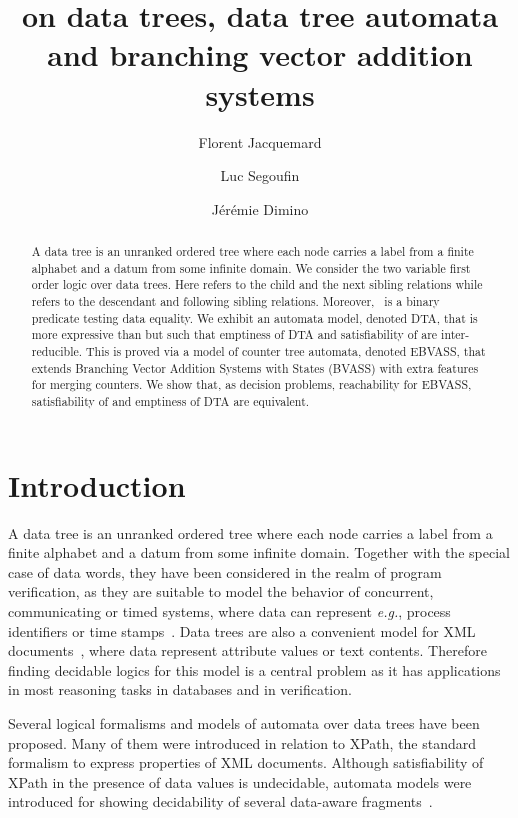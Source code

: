 \documentclass{CSML}
\title[\fotwo on data trees]{\fotwo on data trees, data tree automata and branching vector addition systems}
\author[F.~Jacquemard]{Florent Jacquemard}
\author[L.~Segoufin]{Luc Segoufin}
\author{J\'er\'emie Dimino}
\newcommand\bvass{\textup{BVASS}\xspace}
\newcommand\ebvass{\textup{EBVASS}\xspace}
\newcommand\xpath{\textup{XPath}\xspace}
\newcommand\dad{\textup{DTA}\xspace}
\begin{document}
\begin{abstract}
  A data tree is an unranked ordered tree where each node carries a label from
  a finite alphabet and a datum from some infinite domain.  We consider the two
  variable first order logic \fotwo over data trees.  Here  refers to the
  child and the next sibling relations while  refers to the descendant and
  following sibling relations.  Moreover,~ is a binary predicate testing
  data equality.  We exhibit an automata model, denoted \dad, that is more
  expressive than \fotwo but such that emptiness of \dad and satisfiability of
  \fotwo are inter-reducible.  This is proved via a model of counter tree
  automata, denoted \ebvass, that extends Branching Vector Addition Systems
  with States (\bvass) with extra features for merging counters. We show that,
  as decision problems, reachability for \ebvass, satisfiability of \fotwo and
  emptiness of \dad are equivalent.
\end{abstract}

\maketitle

\section*{Introduction}

A data tree is an unranked ordered tree where each node carries a label from a
finite alphabet and a datum from some infinite domain. Together with the
special case of data words, they have been considered in the realm of program
verification, as they are suitable to model the behavior of concurrent,
communicating or timed systems, where data can represent \textit{e.g.}, process
identifiers or time stamps~\cite{Alur12AAA,BCGK12fossacs,Bouyer02ipl}.  Data
trees are also a convenient model for XML documents~\cite{BojanczykMSS09jacm},
where data represent attribute values or text contents.  Therefore finding
decidable logics for this model is a central problem as it has applications in
most reasoning tasks in databases and in verification.

Several logical formalisms and models of automata over data trees have been
proposed. Many of them were introduced in relation to \xpath, the standard
formalism to express properties of XML documents. Although satisfiability of
\xpath in the presence of data values is undecidable, automata models were
introduced for showing decidability of several 
data-aware fragments~\cite{FS11,BojanczykMSS09jacm,Fig10,F09,JL08}.
\end{document}
